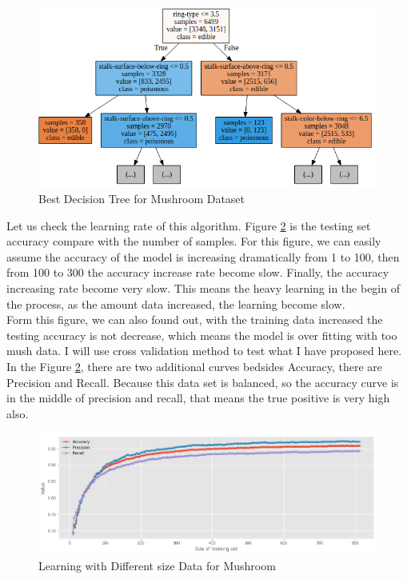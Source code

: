 \documentclass[10pt, conference, compsocconf]{IEEEtran}
\begin{document}
\begin{figure}[h]
	\centering
	\includegraphics[scale = 0.35]{image/decisionTree.png}
	\caption{Best Decision Tree for Mushroom Dataset }
	\label{fig:tree}
\end{figure}
Let us check the learning rate of this algorithm. Figure \ref{fig:treelearn} is the testing set accuracy compare with the number of samples. For this figure, we can easily assume the accuracy of the model is increasing dramatically from 1 to 100, then from 100 to 300 the accuracy increase rate become slow. Finally, the accuracy increasing rate become very slow. This means the heavy learning in the begin of the process, as the amount data increased, the learning become slow. \\
Form this figure, we can also found out, with the training data increased the testing accuracy is not decrease, which means the model is over fitting with too mush data. I will use cross validation method to test what I have proposed here. \\ 
In the Figure \ref{fig:treelearn}, there are two additional curves bedsides Accuracy, there are Precision and Recall. Because this data set is balanced, so the accuracy curve is in the middle of precision and recall, that means the true positive is very high also. 
\begin{figure}[h]
	\centering
	\includegraphics[scale = 0.28]{image/decisionLearning.png}
	\caption{Learning with Different size Data for Mushroom}
	\label{fig:treelearn}
\end{figure} 
\end{document}
